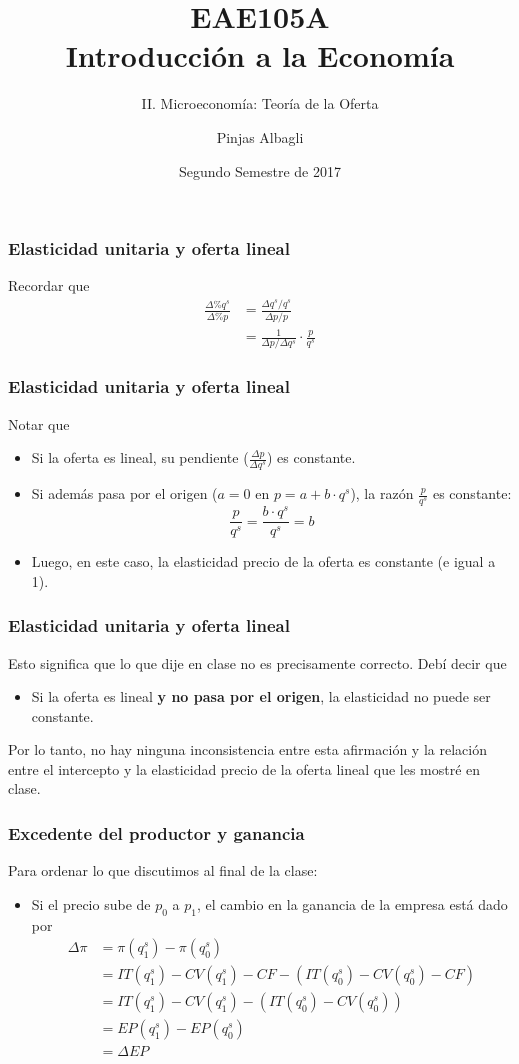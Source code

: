 \documentclass[dvipsnames,table]{beamer}
\title{EAE105A \\ Introducción a la Economía}
\subtitle{II. Microeconomía: Teoría de la Oferta}
\author{Pinjas Albagli}
\institute{Instituto de Economía \\ Pontificia Universidad Católica de Chile}
\date{Segundo Semestre de 2017}
\newcommand{\peq}[1]{{\scriptscriptstyle{#1}}}
\newcommand{\rp}[1]{\left(#1\right)}
\begin{document}
		\begin{frame}
			\frametitle{Elasticidad unitaria y oferta lineal}
			Recordar que 
			\begin{align*}
				\frac{\Delta\%q^\peq{s}}{\Delta\%p}&=\frac{\Delta q^\peq{s}/q^\peq{s}}{\Delta p/p} \\
																					 &=\frac{1}{\Delta p / \Delta q^\peq{s}}\cdot\frac{p}{q^\peq{s}}								
			\end{align*}
		\end{frame}

		\begin{frame}
			\frametitle{Elasticidad unitaria y oferta lineal}
			Notar que
			\begin{itemize}
				\item Si la oferta es lineal, su pendiente ($\frac{\Delta p}{\Delta q^\peq{s}}$) es constante.
				\item Si además pasa por el origen ($a=0$ en $p=a+b\cdot q^\peq{s}$), la razón $\frac{p}{q^\peq{s}}$ es constante: $$\frac{p}{q^\peq{s}}=\frac{b\cdot q^\peq{s}}{q^\peq{s}}=b$$
				\item Luego, en este caso, la elasticidad precio de la oferta es constante (e igual a 1).
			\end{itemize}
		\end{frame}

		\begin{frame}
			\frametitle{Elasticidad unitaria y oferta lineal}
			Esto significa que lo que dije en clase no es precisamente correcto. Debí decir que
			\begin{itemize}
				\item Si la oferta es lineal \textbf{y no pasa por el origen}, la elasticidad no puede ser constante.
			\end{itemize}
			Por lo tanto, no hay ninguna inconsistencia entre esta afirmación y la relación entre el intercepto y la elasticidad precio de la oferta lineal que les mostré en clase.
		\end{frame}

		\begin{frame}
			\frametitle{Excedente del productor y ganancia}
			Para ordenar lo que discutimos al final de la clase:
			\begin{itemize}
				\item Si el precio sube de $p_\peq{0}$ a $p_\peq{1}$, el cambio en la ganancia de la empresa está dado por $$
					\begin{array}{ll}
					\Delta \pi &= \pi\rp{q^\peq{s}_\peq{1}} - \pi\rp{q^\peq{s}_\peq{0}} \\
										 &= IT\rp{q^\peq{s}_\peq{1}}-CV\rp{q^\peq{s}_\peq{1}}-CF-\rp{IT\rp{q^\peq{s}_\peq{0}}-CV\rp{q^\peq{s}_\peq{0}}-CF}\\
										 &= IT\rp{q^\peq{s}_\peq{1}}-CV\rp{q^\peq{s}_\peq{1}} - \rp{IT\rp{q^\peq{s}_\peq{0}}-CV\rp{q^\peq{s}_\peq{0}}} \\
										 &= EP\rp{q^\peq{s}_\peq{1}}-EP\rp{q^\peq{s}_\peq{0}}\\
										 &= \Delta EP
					\end{array}$$
			\end{itemize}
		\end{frame}
\end{document}
